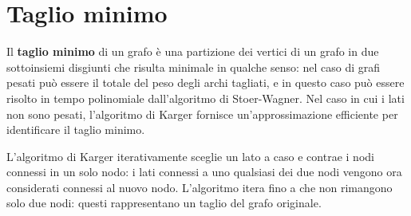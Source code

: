 \documentclass[\main/main.tex]{subfiles}
\begin{document}
\section{Taglio minimo}
\begin{multicols}{2}
\begin{problem}
    Il \textbf{taglio minimo} di un grafo è una partizione dei vertici di un grafo in due sottoinsiemi disgiunti che risulta minimale in qualche senso: nel caso di grafi pesati può essere il totale del peso degli archi tagliati, e in questo caso può essere risolto in tempo polinomiale dall'algoritmo di Stoer-Wagner. Nel caso in cui i lati non sono pesati, l'algoritmo di Karger fornisce un'approssimazione efficiente per identificare il taglio minimo.
\end{problem}
\begin{definition}
    L'algoritmo di Karger iterativamente sceglie un lato a caso e contrae i nodi connessi in un solo nodo: i lati connessi a uno qualsiasi dei due nodi vengono ora considerati connessi al nuovo nodo. L'algoritmo itera fino a che non rimangono solo due nodi: questi rappresentano un taglio del grafo originale.
    

\end{definition}
\end{multicols}
\end{document}
